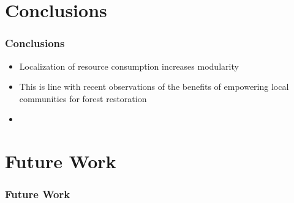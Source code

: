 \documentclass[aspectratio=169]{beamer}
\begin{document}

\section{Conclusions}

\begin{frame}
  \frametitle{Conclusions}

\begin{itemize}
\item Localization of resource consumption increases modularity
\item This is line with recent observations of the benefits of
empowering local communities for forest restoration
\item 
\end{itemize}

\end{frame}

\section{Future Work}

\begin{frame}
  \frametitle{Future Work}
\end{frame}
\end{document}
